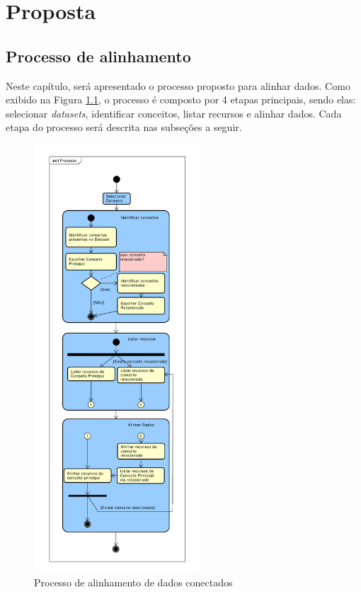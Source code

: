 \chapter{Proposta}
\label{cap:proposta}

\section{Processo de alinhamento}
\label{sec:processo}
Neste capítulo, será apresentado o processo proposto para alinhar dados. Como exibido na Figura \ref{fig:processo}, o processo é composto por 4 etapas principais, sendo elas: selecionar \textit{datasets}, identificar conceitos, listar recursos e alinhar dados. Cada etapa do processo será descrita nas subseções a seguir.

\begin{figure}[htbp]
	\centering
	\includegraphics[width=0.55\textwidth]{./imagens/processo.pdf}
    \caption{Processo de alinhamento de dados conectados}
	\label{fig:processo}
\end{figure}


